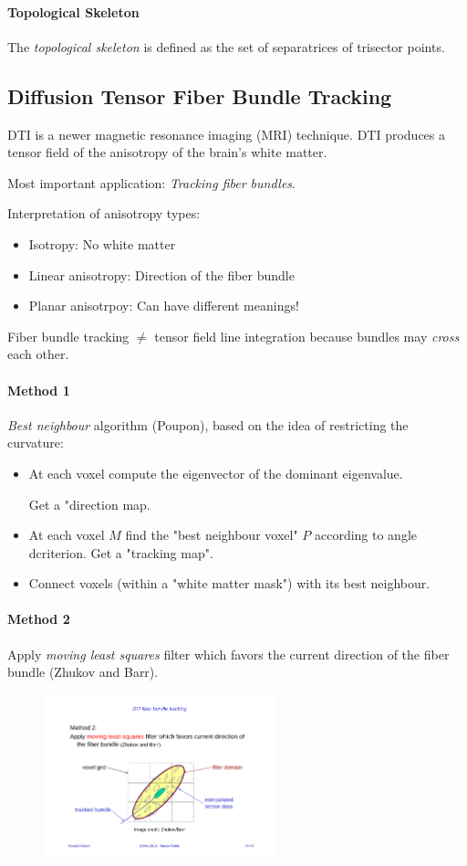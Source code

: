\paragraph{Topological Skeleton} The \emph{topological skeleton} is defined as the set of separatrices of trisector points.

\subsection{Diffusion Tensor Fiber Bundle Tracking}
DTI is a newer magnetic resonance imaging (MRI) technique. DTI produces a tensor field of the anisotropy of the brain's white matter.

Most important application: \emph{Tracking fiber bundles}.

Interpretation of anisotropy types:
\begin{itemize}
\item Isotropy: No white matter
\item Linear anisotropy: Direction of the fiber bundle
\item Planar anisotrpoy: Can have different meanings!
\end{itemize}

Fiber bundle tracking $\neq$ tensor field line integration because bundles may \emph{cross} each other. 

\paragraph{Method 1} \emph{Best neighbour} algorithm (Poupon), based on the idea of restricting the curvature:
\begin{itemize}
    \item At each voxel compute the eigenvector of the dominant eigenvalue. 
    
     Get a "direction map.
    \item At each voxel $M$ find the "best neighbour voxel" $P$ according to angle dcriterion. Get a "tracking map".
    \item Connect voxels (within a "white matter mask") with its best neighbour. 
\end{itemize}

\paragraph{Method 2} Apply \emph{moving least squares} filter which favors the current direction of the fiber bundle (Zhukov and Barr).
\begin{figure}[H]
    \centering
    \includegraphics[width=0.6\textwidth]{img/10_dti_mls}
\end{figure}

